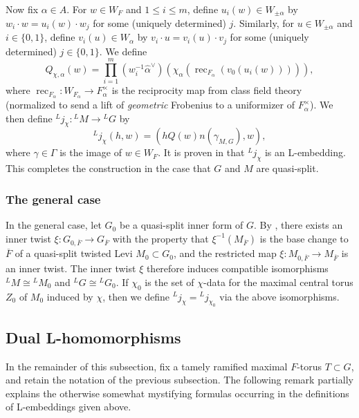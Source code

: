 \documentclass[reqno]{amsart}
\numberwithin{equation}{subsection}
\newcommand{\ol}[1]{\overline{#1}}
\newcommand{\wh}[1]{\widehat{#1}}
\newcommand{\co}{\colon}
\newcommand{\ld}{{}^L}
\DeclareMathOperator{\rec}{rec}
\theoremstyle{remark}
\numberwithin{equation}{subsection}
\numberwithin{figure}{subsection}
\begin{document}
Now fix $\alpha \in A$. For $w \in W_F$ and $1 \leq i \leq m$, define $u_i(w) \in W_{\pm\alpha}$ by $w_i \cdot w = u_i(w) \cdot w_j$ for some (uniquely determined) $j$. Similarly, for $u \in W_{\pm\alpha}$ and $i \in \{0, 1\}$, define $v_i(u) \in W_\alpha$ by $v_i \cdot u = v_i(u) \cdot v_j$ for some (uniquely determined) $j \in \{0, 1\}$. We define
\begin{equation}\label{eqn:def-of-Q}
Q_{\chi,\alpha}(w) = \prod_{i=1}^m (w_i^{-1}\wh\alpha^\vee)(\chi_\alpha(\rec_{F_\alpha}(v_0(u_i(w))))),
\end{equation}
where $\rec_{F_\alpha}\co W_{F_\alpha}\to F_\alpha^\times$ is the reciprocity map from class field theory (normalized to send a lift of \emph{geometric} Frobenius to a uniformizer of $F_\alpha^\times$). We then define $\ld j_\chi\co \ld M \to \ld G$ by
\begin{equation}\label{eqn:def-of-L-embedding}
\ld j_\chi(h, w) = (hQ(w)n(\gamma_{M,G}), w),
\end{equation}
where $\gamma \in \Gamma$ is the image of $w \in W_F$. It is proven in \cite[Corollary 6.7]{Kal21a} that $\ld j_\chi$ is an L-embedding. This completes the construction in the case that $G$ and $M$ are quasi-split.

\subsubsection{The general case}
In the general case, let $G_0$ be a quasi-split inner form of $G$. By \cite[Lemma 6.4]{Kal21a}, there exists an inner twist $\xi\co G_{0,\ol F} \to G_{\ol F}$ with the property that $\xi^{-1}(M_{\ol F})$ is the base change to $\ol F$ of a quasi-split twisted Levi $M_0 \subset G_0$, and the restricted map $\xi\co M_{0,\ol F} \to M_{\ol F}$ is an inner twist. The inner twist $\xi$ therefore induces compatible isomorphisms $\ld M \cong \ld M_0$ and $\ld G \cong \ld G_0$. If $\chi_0$ is the set of $\chi$-data for the maximal central torus $Z_0$ of $M_0$ induced by $\chi$, then we define $\ld j_\chi = \ld j_{\chi_0}$ via the above isomorphisms.

\subsection{Dual L-homomorphisms}\label{ss:dual-l-homs}

In the remainder of this subsection, fix a tamely ramified maximal $F$-torus $T \subset G$, and retain the notation of the previous subsection. The following remark partially explains the otherwise somewhat mystifying formulas occurring in the definitions of L-embeddings given above.
\end{document}
